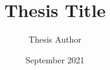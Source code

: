 \documentclass[12pt, eng, master]{thesis}
\title{Thesis Title}{제목}
\author{Thesis Author}{작가}
\date{September 2021}{2025년 9월}
\begin{document}
\makecover
\setbodylayout
\frontmatter

\tableofcontents \clearpage
\listoffigures \clearpage
\listoftables \clearpage

\mainmatter



\backmatter
\makebibliography
\makeabstract
\end{document}
